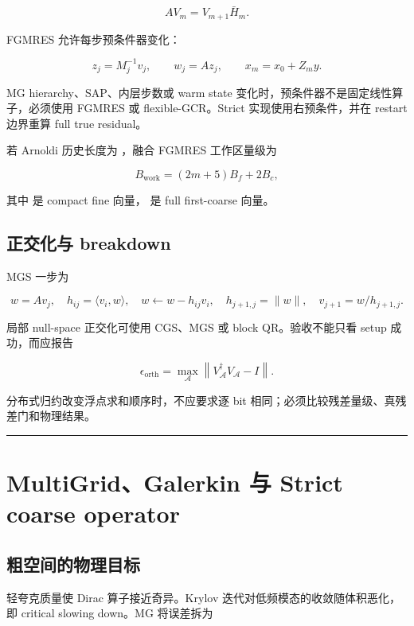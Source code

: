 \documentclass[UTF8,a4paper,10pt]{ctexart}
\DeclareRobustCommand{\pycode}[1]{\texorpdfstring{\texttt{\seqsplit{#1}}}{#1}}
\begin{document}
\begin{displaymath}
AV_m=V_{m+1}\bar H_m.
\end{displaymath}

FGMRES 允许每步预条件器变化：

\begin{displaymath}
z_j=M_j^{-1}v_j, \qquad w_j=Az_j, \qquad x_m=x_0+Z_my.
\end{displaymath}

MG hierarchy、SAP、内层步数或 warm state 变化时，预条件器不是固定线性算子，必须使用 FGMRES 或 flexible-GCR。Strict 实现使用右预条件，并在 restart 边界重算 full true residual。

若 Arnoldi 历史长度为 \pycode{m}，融合 FGMRES 工作区量级为

\begin{displaymath}
B_{\mathrm{work}}=(2m+5)B_f+2B_c,
\end{displaymath}

其中 \pycode{B\_f} 是 compact fine 向量，\pycode{B\_c} 是 full first-coarse 向量。

\subsection{正交化与 breakdown}
MGS 一步为

\begin{displaymath}
w=Av_j, \quad h_{ij}=\langle v_i,w\rangle, \quad w\leftarrow w-h_{ij}v_i, \quad h_{j+1,j}=\| w\|, \quad v_{j+1}=w/h_{j+1,j}.
\end{displaymath}

局部 null-space 正交化可使用 CGS、MGS 或 block QR。验收不能只看 setup 成功，而应报告

\begin{displaymath}
\epsilon_{\mathrm{orth}}= \max_{\mathcal A} \left\| V_{\mathcal A}^\dagger V_{\mathcal A}-I\right\|.
\end{displaymath}

分布式归约改变浮点求和顺序时，不应要求逐 bit 相同；必须比较残差量级、真残差门和物理结果。

\par\noindent\rule{\linewidth}{0.4pt}\par
\section{MultiGrid、Galerkin 与 Strict coarse operator}
\subsection{粗空间的物理目标}
轻夸克质量使 Dirac 算子接近奇异。Krylov 迭代对低频模态的收敛随体积恶化，即 critical slowing down。MG 将误差拆为
\end{document}
